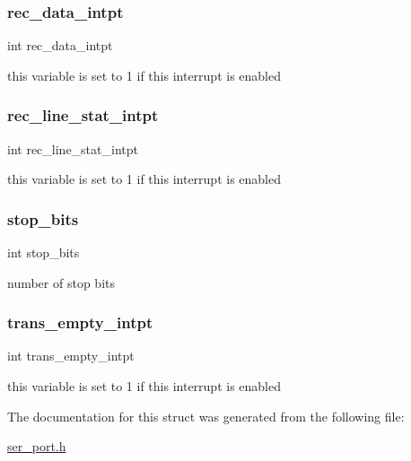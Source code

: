 \subsubsection{\texorpdfstring{rec\+\_\+data\+\_\+intpt}{rec\_data\_intpt}}
{\footnotesize\ttfamily int rec\+\_\+data\+\_\+intpt}



this variable is set to 1 if this interrupt is enabled 

\hypertarget{structser__conf__t_a95598f55f1281cb9f1b46ee311fe793e}{}\label{structser__conf__t_a95598f55f1281cb9f1b46ee311fe793e} 
\subsubsection{\texorpdfstring{rec\+\_\+line\+\_\+stat\+\_\+intpt}{rec\_line\_stat\_intpt}}
{\footnotesize\ttfamily int rec\+\_\+line\+\_\+stat\+\_\+intpt}



this variable is set to 1 if this interrupt is enabled 

\hypertarget{structser__conf__t_a146991e1ecc6d049155a7a71739e9d0d}{}\label{structser__conf__t_a146991e1ecc6d049155a7a71739e9d0d} 
\subsubsection{\texorpdfstring{stop\+\_\+bits}{stop\_bits}}
{\footnotesize\ttfamily int stop\+\_\+bits}



number of stop bits 

\hypertarget{structser__conf__t_ada0c84c6581ba1cfae8bd5e3ee17443a}{}\label{structser__conf__t_ada0c84c6581ba1cfae8bd5e3ee17443a} 
\subsubsection{\texorpdfstring{trans\+\_\+empty\+\_\+intpt}{trans\_empty\_intpt}}
{\footnotesize\ttfamily int trans\+\_\+empty\+\_\+intpt}



this variable is set to 1 if this interrupt is enabled 



The documentation for this struct was generated from the following file\+:\begin{DoxyCompactItemize}
\item 
\hyperlink{ser__port_8h}{ser\+\_\+port.\+h}\end{DoxyCompactItemize}
